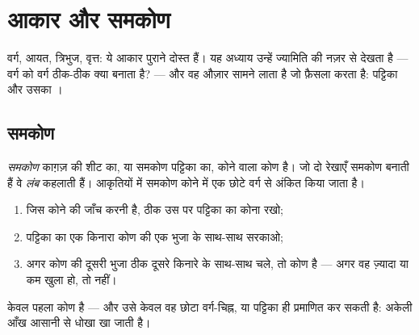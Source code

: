 \chapter{आकार और समकोण}\label{ch:g3:shapes}

वर्ग, आयत, त्रिभुज, वृत्त: ये आकार पुराने दोस्त हैं। यह अध्याय
उन्हें ज्यामिति की नज़र से देखता है --- वर्ग को वर्ग ठीक-ठीक
क्या बनाता है? --- और वह औज़ार सामने लाता है जो फ़ैसला करता है:
 पट्टिका और उसका ।

\section{समकोण}

\begin{definition}[समकोण]\label{def:g3:shapes:rightangle}
\emph{समकोण} काग़ज़ की शीट का, या समकोण पट्टिका
का, कोने वाला कोण है। जो दो रेखाएँ समकोण बनाती हैं वे
\emph{लंब} कहलाती हैं। आकृतियों में समकोण कोने में एक छोटे
वर्ग से अंकित किया जाता है।
\end{definition}

\begin{method}[समकोण की जाँच]\label{met:g3:shapes:check}
\begin{enumerate}
  \item जिस कोने की जाँच करनी है, ठीक उस पर  पट्टिका का
        कोना रखो;
  \item पट्टिका का एक किनारा कोण की एक भुजा के साथ-साथ सरकाओ;
  \item अगर कोण की दूसरी भुजा ठीक दूसरे किनारे के साथ-साथ चले,
        तो कोण  है --- अगर वह ज़्यादा या कम खुला हो, तो
        नहीं।
\end{enumerate}
\end{method}

\begin{omfigure}

{\small केवल पहला कोण  है --- और उसे केवल वह छोटा
वर्ग-चिह्न, या  पट्टिका ही प्रमाणित कर सकती है: अकेली आँख
आसानी से धोखा खा जाती है।}
\end{omfigure}

